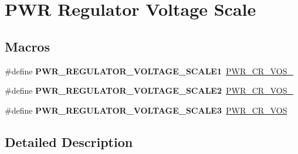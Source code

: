 \hypertarget{group___p_w_r___regulator___voltage___scale}{\section{P\-W\-R Regulator Voltage Scale}
\label{group___p_w_r___regulator___voltage___scale}
}
\subsection*{Macros}
\begin{DoxyCompactItemize}
\item 
\hypertarget{group___p_w_r___regulator___voltage___scale_ga3b5ca5ab9c19938a14d273825bcf840e}{\#define {\bfseries P\-W\-R\-\_\-\-R\-E\-G\-U\-L\-A\-T\-O\-R\-\_\-\-V\-O\-L\-T\-A\-G\-E\-\_\-\-S\-C\-A\-L\-E1}~\hyperlink{group___peripheral___registers___bits___definition_ga27b4e08a8936aa9828c5d683fde2fb59}{P\-W\-R\-\_\-\-C\-R\-\_\-\-V\-O\-S\-\_}}\label{group___p_w_r___regulator___voltage___scale_ga3b5ca5ab9c19938a14d273825bcf840e}

\item 
\hypertarget{group___p_w_r___regulator___voltage___scale_gaa0d38e304a0adfdbb58a61c96bdb95e9}{\#define {\bfseries P\-W\-R\-\_\-\-R\-E\-G\-U\-L\-A\-T\-O\-R\-\_\-\-V\-O\-L\-T\-A\-G\-E\-\_\-\-S\-C\-A\-L\-E2}~\hyperlink{group___peripheral___registers___bits___definition_gac3093c26b256c965cebec3b2e388a3b4}{P\-W\-R\-\_\-\-C\-R\-\_\-\-V\-O\-S\-\_}}\label{group___p_w_r___regulator___voltage___scale_gaa0d38e304a0adfdbb58a61c96bdb95e9}

\item 
\hypertarget{group___p_w_r___regulator___voltage___scale_gabed272232ad95f663da2a758834d0ba9}{\#define {\bfseries P\-W\-R\-\_\-\-R\-E\-G\-U\-L\-A\-T\-O\-R\-\_\-\-V\-O\-L\-T\-A\-G\-E\-\_\-\-S\-C\-A\-L\-E3}~\hyperlink{group___peripheral___registers___bits___definition_gaccc33f1ba4e374e116ffa50f3a503030}{P\-W\-R\-\_\-\-C\-R\-\_\-\-V\-O\-S}}\label{group___p_w_r___regulator___voltage___scale_gabed272232ad95f663da2a758834d0ba9}

\end{DoxyCompactItemize}


\subsection{Detailed Description}
